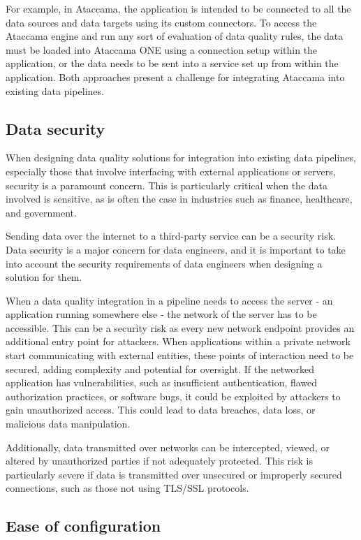 For example, in Ataccama, the application is intended to be connected to all the data sources and data targets using its custom connectors. To access the Ataccama engine and run any sort of evaluation of data quality rules, the data must be loaded into Ataccama ONE using a connection setup within the application, or the data needs to be sent into a service set up from within the application. Both approaches present a challenge for integrating Ataccama into existing data pipelines.

\subsection{Data security}

When designing data quality solutions for integration into existing data pipelines, especially those that involve interfacing with external applications or servers, security is a paramount concern. This is particularly critical when the data involved is sensitive, as is often the case in industries such as finance, healthcare, and government.

 Sending data over the internet to a third-party service can be a security risk. Data security is a major concern for data engineers, and it is important to take into account the security requirements of data engineers when designing a solution for them.

When a data quality integration in a pipeline needs to access the server - an application running somewhere else - the network of the server has to be accessible. This can be a security risk as every new network endpoint provides an additional entry point for attackers. When applications within a private network start communicating with external entities, these points of interaction need to be secured, adding complexity and potential for oversight.  If the networked application has vulnerabilities, such as insufficient authentication, flawed authorization practices, or software bugs, it could be exploited by attackers to gain unauthorized access. This could lead to data breaches, data loss, or malicious data manipulation. 


Additionally, data transmitted over networks can be intercepted, viewed, or altered by unauthorized parties if not adequately protected. This risk is particularly severe if data is transmitted over unsecured or improperly secured connections, such as those not using TLS/SSL protocols. 

\subsection{Ease of configuration}

